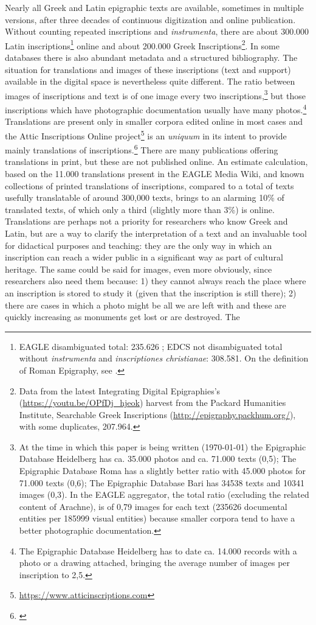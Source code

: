 \documentclass[amsthm,ebook]{saparticle}
\begin{document}
Nearly all Greek and Latin epigraphic texts are available, sometimes in multiple versions, after three decades of continuous digitization and online publication. Without counting repeated inscriptions and \textit{instrumenta}, there are about 300.000 Latin inscriptions\footnote{EAGLE disambiguated total: 235.626 ; EDCS not disambiguated total without \textit{instrumenta} and \textit{inscriptiones christianae}: 308.581. On the definition of Roman Epigraphy, see \citet{Panciera2012}.} online and about 200.000 Greek Inscriptions\footnote{Data from the latest Integrating Digital Epigraphies's (\url{https://youtu.be/OPfDj_hjeok}) harvest from the Packard Humanities Institute, Searchable Greek Inscriptions (\url{http://epigraphy.packhum.org/}), with some duplicates, 207.964.}. In some databases there is also abundant metadata and  a structured bibliography. The situation for translations and images of these inscriptions (text and support) available in the digital space is nevertheless quite different. The ratio between images of inscriptions and text is of one image every two inscriptions,\footnote{At the time in which this paper is being written (\today) the Epigraphic Database Heidelberg has ca. 35.000 photos and ca. 71.000 texts (0,5); The Epigraphic Database Roma has a slightly better ratio with 45.000 photos for 71.000 texts (0,6); The Epigraphic Database Bari has 34538 texts and 10341 images (0,3). In the EAGLE aggregator, the total ratio (excluding the related content of Arachne), is of 0,79 images for each text (235626 documental entities per 185999 visual entities) because smaller corpora tend to have a better photographic documentation.} but those inscriptions which have photographic documentation usually have many photos.\footnote{The Epigraphic Database Heidelberg has to date ca. 14.000 records with a photo or a drawing attached, bringing the average number of images per inscription to 2,5.} Translations are present only in smaller corpora edited online in most cases and the Attic Inscriptions Online project\footnote{\url{https://www.atticinscriptions.com}} is an \textit{uniquum} in its intent to provide mainly translations of inscriptions.\footnote{\citet{Lambert2014}} There are many publications offering translations in print, but these are not published online. An estimate calculation, based on the 11.000 translations present in the EAGLE Media Wiki, and known collections of printed translations of inscriptions, compared to a total of texts usefully translatable of around 300,000 texts, brings to an alarming 10\% of translated texts, of which only a third (slightly more than 3\%) is online. Translations are perhaps not a priority for researchers who know Greek and Latin, but are a way to clarify the interpretation of a text and an invaluable tool for didactical purposes and teaching: they are the only way in which an inscription can reach a wider public in a significant way as part of cultural heritage. The same could be said for images, even more obviously, since researchers also need them because: 1) they cannot always reach the place where an inscription is stored to study it  (given that the inscription is still there); 2) there are cases  in which a photo might be all we are left with and these are quickly increasing as monuments get lost or are destroyed. The 
\end{document}
